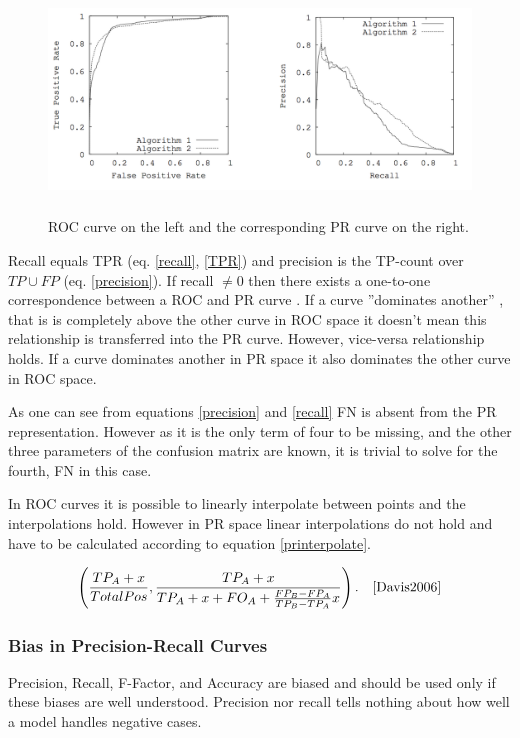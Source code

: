 \documentclass[english,12pt,a4paper,pdftex,elec,utf8, table]{aaltothesis}
\begin{document}
\begin{figure}[htb]
\begin{center}
\includegraphics[height=6cm]{figures/rocpr}
\end{center}
\caption{ROC curve on the left and the corresponding PR curve on the right. \cite{Davis2006}}
\label{rocpr}
\end{figure}

Recall equals TPR (eq. \ref{recall}, \ref{TPR}) and precision is the TP-count over $TP \cup FP$ (eq. \ref{precision}). If recall $\neq 0$ then there exists a one-to-one correspondence between a ROC and PR curve \cite{Davis2006}. If a curve ''dominates another'' \cite{Provost1997}, that is is completely above the other curve in ROC space it doesn't mean this relationship is transferred into the PR curve. However, vice-versa relationship holds. If a curve dominates another in PR space it also dominates the other curve in ROC space. \cite{Davis2006}

As one can see from equations \ref{precision} and \ref{recall} FN is absent from the PR representation. However as it is the only term of four to be missing, and the other three parameters of the confusion matrix are known, it is trivial to solve for the fourth, FN in this case. \cite{Davis2006}

In ROC curves it is possible to linearly interpolate between points and the interpolations hold. However in PR space linear interpolations do not hold and have to be calculated according to equation \ref{printerpolate}. \cite{Davis2006}

\begin{equation}\label{printerpolate}
\left(\frac{TP_A+x}{Total Pos}, \frac{TP_A+x}{TP_A+x+FO_A+ \frac{FP_B-FP_A}{TP_B-TP_A}x} \right). \quad \cite{Davis2006}
\end{equation}

\subsubsection{Bias in Precision-Recall Curves}
Precision, Recall, F-Factor, and Accuracy are biased and should be used only if these biases are well understood. Precision nor recall tells nothing about how well a model handles negative cases. \cite{POWERS2011}
\end{document}
